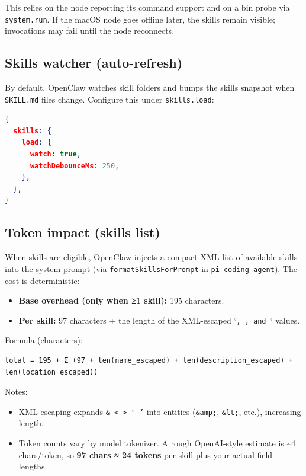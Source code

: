 This relies on the node reporting its command support and on a bin probe via \texttt{system.run}. If the macOS node goes offline later, the skills remain visible; invocations may fail until the node reconnects.

\subsection{Skills watcher (auto-refresh)}


By default, OpenClaw watches skill folders and bumps the skills snapshot when \texttt{SKILL.md} files change. Configure this under \texttt{skills.load}:

\begin{lstlisting}[language=json]
{
  skills: {
    load: {
      watch: true,
      watchDebounceMs: 250,
    },
  },
}
\end{lstlisting}


\subsection{Token impact (skills list)}


When skills are eligible, OpenClaw injects a compact XML list of available skills into the system prompt (via \texttt{formatSkillsForPrompt} in \texttt{pi-coding-agent}). The cost is deterministic:

\begin{itemize}
  \item \textbf{Base overhead (only when ≥1 skill):} 195 characters.
  \item \textbf{Per skill:} 97 characters + the length of the XML-escaped `\texttt{, }\texttt{, and }` values.
\end{itemize}


Formula (characters):

\begin{lstlisting}
total = 195 + Σ (97 + len(name_escaped) + len(description_escaped) + len(location_escaped))
\end{lstlisting}


Notes:

\begin{itemize}
  \item XML escaping expands \texttt{\& < > " '} into entities (\texttt{\&amp;}, \texttt{\&lt;}, etc.), increasing length.
  \item Token counts vary by model tokenizer. A rough OpenAI-style estimate is \textasciitilde{}4 chars/token, so \textbf{97 chars ≈ 24 tokens} per skill plus your actual field lengths.
\end{itemize}


